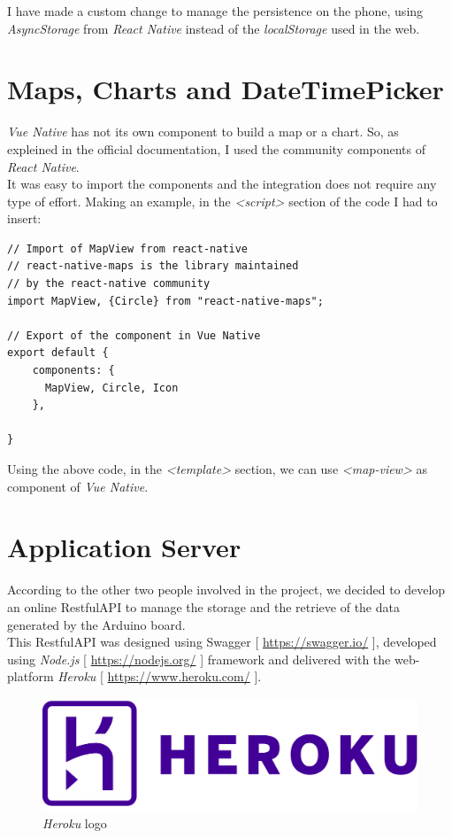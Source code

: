 I have made a custom change to manage the persistence on the phone, using \textit{AsyncStorage} from \textit{React Native} instead of the \textit{localStorage} used in the web.



\section{Maps, Charts and DateTimePicker}
\textit{Vue Native} has not its own component to build a map or a chart. So, as expleined in the official documentation, I used the community components of \textit{React Native}.\\

It was easy to import the components and the integration does not require any type of effort. Making an example, in the \textit{<script>} section of the code I had to insert:

\medskip
\begin{lstlisting}[style=htmlcssjs]
// Import of MapView from react-native
// react-native-maps is the library maintained
// by the react-native community
import MapView, {Circle} from "react-native-maps";

// Export of the component in Vue Native
export default {
    components: {
      MapView, Circle, Icon
    },
    
}
\end{lstlisting}

Using the above code, in the \textit{<template>} section, we can use \textit{<map-view>} as component of \textit{Vue Native}.

\section{Application Server}
According to the other two people involved in the project, we decided to develop an online RestfulAPI to manage the storage and the retrieve of the data generated by the Arduino board.\\

This RestfulAPI was designed using Swagger [ \url{https://swagger.io/} ], developed using \textit{Node.js} [ \url{https://nodejs.org/} ] framework and delivered with the web-platform \textit{Heroku} [ \url{https://www.heroku.com/} ].\\

\begin{figure}[h]
\begin{center}
  \includegraphics[width=.5\textwidth]{img/logos/logo_heroku.png}
  \hspace{0.05\linewidth}
  \centering
  \caption{\textit{Heroku} logo}
  \label{img:logo_heroku}
\end{center}
\end{figure}

